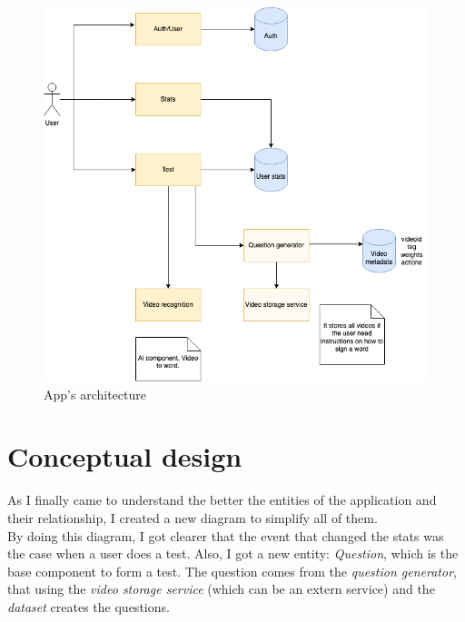 \begin{figure}[H]
    \centering
        \includegraphics[width=\textwidth]{assets/diagrams/architecture.png}
    \caption{App's architecture}
    \label{fig:design_architecture_last}
\end{figure}

\section{Conceptual design}
As I finally came to understand the better the entities of the application and their relationship, I created a new diagram to simplify all of them. \\

By doing this diagram, I got clearer that the event that changed the stats was the case when a user does a test. Also, I got a new entity: \textit{Question}, which is the base component to form a test. The question comes from the \textit{question generator}, that using the \textit{video storage service} (which can be an extern service) and the \textit{dataset} creates the questions.

